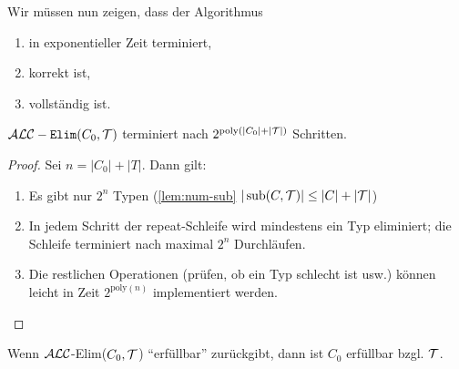Wir müssen nun zeigen, dass der Algorithmus
\begin{enumerate}
    \item in exponentieller Zeit terminiert,
    \item korrekt ist,
    \item vollständig ist.
\end{enumerate}

\begin{lemma}
    $\mathcal{A}\mathcal{L}\mathcal{C}-\texttt{Elim}(C_0,\mathcal{T})$ terminiert nach $2^{\text{poly}(|C_0|+|\mathcal{T}|)}$ Schritten.
\end{lemma}

\begin{proof}
Sei $n = \left| C_{0} \right| + |T|$. Dann gilt:

\begin{enumerate}
\item Es gibt nur $2^{n}$ Typen (\autoref{lem:num-sub} $|\operatorname{sub}(C, \mathcal{T})| \leq |C| + |\mathcal{T}|$)
\item
  In jedem Schritt der repeat-Schleife wird mindestens ein Typ
  eliminiert; die Schleife terminiert nach maximal $2^{n}$
  Durchläufen.
\item
  Die restlichen Operationen (prüfen, ob ein Typ schlecht ist usw.)
  können leicht in Zeit $2^{\text{poly}\left( n \right)}$ implementiert werden.
\end{enumerate}
\end{proof}

\begin{lemma}
    Wenn $\mathcal{A}\mathcal{L}\mathcal{C}$-Elim($C_0,\mathcal{T}$) \enquote{erfüllbar} zurückgibt, dann ist $C_0$ erfüllbar bzgl. $\mathcal{T}$.
\end{lemma}


